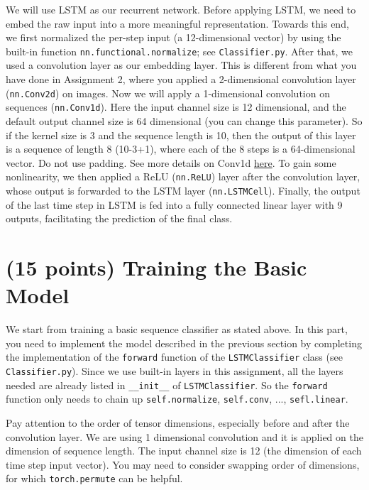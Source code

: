 \documentclass[11pt]{report}
\begin{document}
We will use LSTM as our recurrent network. 
Before applying LSTM, 
we need to embed the raw input into a more meaningful representation. 
Towards this end, 
we first normalized the per-step input (a 12-dimensional vector) by using the built-in function \texttt{nn.functional.normalize}; 
see \texttt{Classifier.py}. 
After that, we used a convolution layer as our embedding layer. 
This is different from what you have done in Assignment 2, 
where you applied a 2-dimensional convolution layer (\texttt{nn.Conv2d}) on images.
Now we will apply a 1-dimensional convolution on sequences (\texttt{nn.Conv1d}). 
Here the input channel size is 12 dimensional,
and the default output channel size is 64 dimensional (you can change this parameter).
So if the kernel size is 3 and the sequence length is 10,
then the output of this layer is a sequence of length 8 (10-3+1),
where each of the 8 steps is a 64-dimensional vector.
Do not use padding.
See more details on Conv1d \href{https://pytorch.org/docs/stable/nn.html}{here}.
To gain some nonlinearity, we then applied a ReLU (\texttt{nn.ReLU}) layer after the convolution layer, 
whose output is forwarded to the LSTM layer (\texttt{nn.LSTMCell}). 
Finally, the output of the last time step in LSTM is fed into a fully connected linear layer with 9 outputs,
facilitating the prediction of the final class.




\section{(15 points) Training the Basic Model}
\label{sec:basic}

We start from training a basic sequence classifier as stated above. 
In this part, you need to implement the model described in the previous section by completing the implementation of the \texttt{forward} function of the \texttt{LSTMClassifier} class 
(see \texttt{Classifier.py}). 
Since we use built-in layers in this assignment, 
all the layers needed are already listed in \texttt{\_\_init\_\_} of \texttt{LSTMClassifier}. 
So the \texttt{forward} function only needs to chain up
\texttt{self.normalize}, \texttt{self.conv}, ..., \texttt{sefl.linear}.


Pay attention to the order of tensor dimensions, especially before and after the convolution layer. 
We are using 1 dimensional convolution and it is applied on the dimension of sequence length. 
The input channel size is 12 (the dimension of each time step input vector). 
You may need to consider swapping order of dimensions, 
for which \texttt{torch.permute} can be helpful. 
\end{document}
